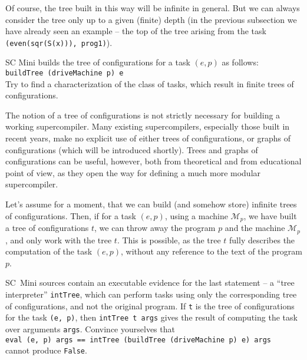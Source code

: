 Of course, the tree built in this way will be infinite in general.
But we can always consider the tree only up to a given (finite) depth
(in the previous subsection we have already seen an example -- the top of the
tree arising from the task \texttt{(even(sqr(S(x))), prog1)}).



\begin{exercise}
SC Mini builds the tree of configurations for a task $(e, p)$ as follows:
\\ \texttt{buildTree (driveMachine p) e}
\\
Try to find a characterization of the class of tasks, which result in finite trees of configurations.
\end{exercise}

The notion of a tree of configurations is not strictly necessary for building a working 
supercompiler.
Many existing supercompilers, especially those built in recent years,
make no explicit use of either trees of configurations, or graphs of configurations 
(which will be introduced shortly).
Trees and graphs of configurations can be useful, however, 
both from theoretical and from educational point of view,
as they open the way for defining a much more modular supercompiler.

Let's assume for a moment, that we can build (and somehow store) infinite trees of configurations.
Then, if for a task $(e, p)$, using a machine $\mathcal{M}_p$, we have built a tree of configurations $t$,
we can throw away the program $p$ and the machine $\mathcal{M}_p$, and only work with the tree $t$.
This is possible, as the tree $t$ fully describes the computation of the task $(e, p)$,
without any reference to the text of the program $p$.

\begin{exercise}
SC~Mini sources contain an executable evidence for the last statement --
a ``tree interpreter'' \texttt{intTree}, which can perform tasks using only the 
corresponding tree of configurations, and not the original program.
If \texttt{t} is the tree of configurations for the task \texttt{(e, p)}, 
then \texttt{intTree t args} gives the result of computing the task over arguments \texttt{args}. 
Convince yourselves that
\\  \texttt{eval (e, p) args == intTree (buildTree (driveMachine p) e) args}
\\  cannot produce \texttt{False}.
\end{exercise}

